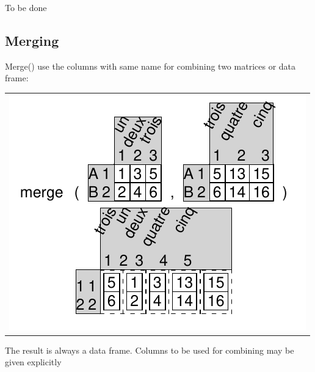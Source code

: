 \documentclass[pdflatex]{article}
\begin{document}
To be done


% 

\subsection{Merging}

Merge() use the columns with same name for combining two matrices or data frame:

\begin{tabular}{c}
\includegraphics{merge.pdf}
\end{tabular}

The result is always a data frame. Columns to be used for combining may be
given explicitly


%
% 


\end{document}
